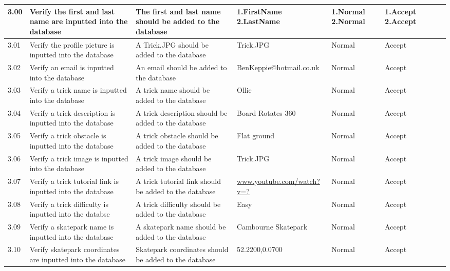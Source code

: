 \begin{landscape}
\begin{center}
\begin{longtable}{|p{1.5cm}|p{2.5cm}|p{2.5cm}|p{2cm}|p{2cm}|p{2cm}|p{2cm}|p{2cm}|}
3.00 & Verify the first and last name are inputted into the database & The first and last name should be added to the database & 1.FirstName 2.LastName & 1.Normal 2.Normal & 1.Accept 2.Accept & &  \\ \hline

3.01 & Verify the profile picture is inputted into the database & A Trick.JPG should be added to the database & Trick.JPG & Normal & Accept & & \\ \hline

3.02 & Verify an email is inputted into the database & An email should be added to the database & BenKeppie@hotmail.co.uk & Normal & Accept  & & \\ \hline

3.03 & Verify a trick name is inputted into the database & A trick name should be added to the database & Ollie & Normal & Accept & & \\ \hline

3.04 & Verify a trick description is inputted into the database & A trick description should be added to the database & Board Rotates 360 & Normal & Accept & & \\ \hline

3.05  & Verify a trick obstacle is inputted into the database & A trick obstacle should be added to the database & Flat ground & Normal & Accept & & \\ \hline

3.06 & Verify a trick image is inputted into the database & A trick image should be added to the database & Trick.JPG & Normal & Accept & & \\ \hline

3.07 & Verify a trick tutorial link is inputted into the database & A trick tutorial link should be added to the database & \url{www.youtube.com/watch?v=?} & Normal & Accept & & \\ \hline

3.08 & Verify a trick difficulty is inputted into the databse & A trick difficulty should be added to the database & Easy & Normal & Accept & & \\ \hline

3.09 & Verify a skatepark name is inputted into the database & A skatepark name should be added to the database & Cambourne Skatepark & Normal & Accept & & \\ \hline

3.10 & Verify skatepark coordinates are inputted into the database & Skatepark coordinates should be added to the database & 52.2200,0.0700 & Normal & Accept & & \\ \hline


\end{longtable}
\end{center}
\end{landscape}
